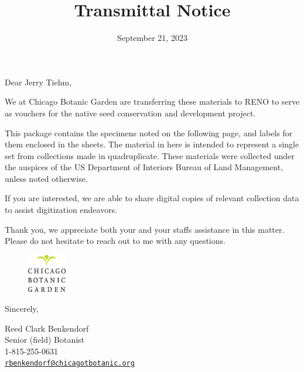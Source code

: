 \documentclass[
]{article}
\title{Transmittal Notice}
\author{}
\date{\vspace{-2.5em}September 21, 2023}
\begin{document}
\maketitle

\fontsize{14pt}{16pt}\selectfont

\vspace{1cm}

Dear Jerry Tiehm,

\vspace{1cm}

We at Chicago Botanic Garden are transferring these materials to RENO to
serve as vouchers for the native seed conservation and development
project.

\vspace{1cm}

This package contains the specimens noted on the following page, and
labels for them enclosed in the sheets. The material in here is intended
to represent a single set from collections made in quadruplicate. These
materials were collected under the auspices of the US Department of
Interiors Bureau of Land Management, unless noted otherwise.

\vspace{1cm}

If you are interested, we are able to share digital copies of relevant
collection data to assist digitization endeavors.

\vspace{1cm}

Thank you, we appreciate both your and your staffs assistance in this
matter. Please do not hesitate to reach out to me with any questions.

\vspace{1cm}

\begin{figure}
  \centering
    \includegraphics[width=0.15\textwidth]{CBG-logo.png}
\end{figure}

Sincerely,

\vspace{0.5cm} 
\fontsize{14pt}{14pt}\selectfont

Reed Clark Benkendorf\\
Senior (field) Botanist\\
1-815-255-0631\\
\href{mailto:rbenkendorf@chicagotbotanic.org}{\nolinkurl{rbenkendorf@chicagotbotanic.org}}
\end{document}
